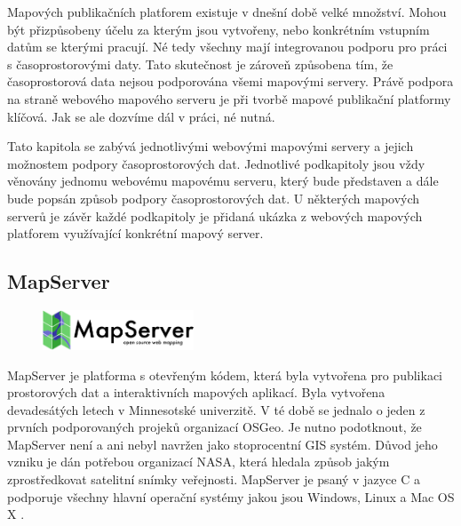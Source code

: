 Mapových publikačních platforem existuje v dnešní době velké
množství. Mohou být přizpůsobeny účelu za kterým jsou vytvořeny, nebo
konkrétním vstupním datům se kterými pracují. Né tedy všechny mají
integrovanou podporu pro práci s časoprostorovými daty. Tato
skutečnost je zároveň způsobena tím, že časoprostorová data nejsou
podporována všemi mapovými servery. Právě podpora na straně webového
mapového serveru je při tvorbě mapové publikační platformy
klíčová. Jak se ale dozvíme dál v práci, né nutná.
 
Tato kapitola se zabývá jednotlivými webovými mapovými servery a
jejich možnostem podpory časoprostorových dat. Jednotlivé podkapitoly
jsou vždy věnovány jednomu webovému mapovému serveru, který bude
představen a dále bude popsán způsob podpory časoprostorových dat. U
některých mapových serverů je závěr každé podkapitoly je přidaná
ukázka z webových mapových platforem využívající konkrétní mapový
server.

\subsection{MapServer}

\begin{figure}[h!]
	\centering
	\includegraphics[width=0.4\textwidth]{../img/mapserver-logo.png}
	\label{fig:mapserver-logo}
\end{figure}
\bigskip

MapServer je platforma s otevřeným kódem, která byla vytvořena pro
publikaci prostorových dat a interaktivních mapových aplikací. Byla
vytvořena devadesátých letech v Minnesotské univerzitě. V té době se
jednalo o jeden z prvních podporovaných projeků organizací OSGeo. Je
nutno podotknout, že MapServer není a ani nebyl navržen jako
stoprocentní GIS systém. Důvod jeho vzniku je dán potřebou organizací
NASA, která hledala způsob jakým zprostředkovat satelitní snímky
veřejnosti. MapServer je psaný v jazyce C a podporuje všechny hlavní
operační systémy jakou jsou Windows, Linux a Mac OS X
\cite{mapserver_about}.

